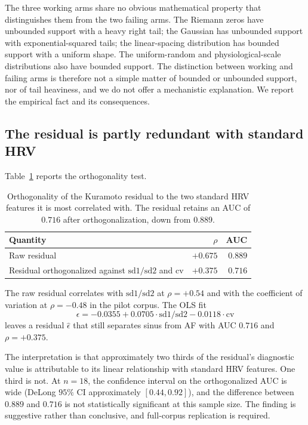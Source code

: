 \documentclass[11pt]{article}
\begin{document}
The three working arms share no obvious mathematical property that
distinguishes them from the two failing arms. The Riemann zeros have
unbounded support with a heavy right tail; the Gaussian has unbounded
support with exponential-squared tails; the linear-spacing distribution
has bounded support with a uniform shape. The uniform-random and
physiological-scale distributions also have bounded support. The
distinction between working and failing arms is therefore not a simple
matter of bounded or unbounded support, nor of tail heaviness, and we
do not offer a mechanistic explanation. We report the empirical fact
and its consequences.

\subsection{The residual is partly redundant with standard HRV}

Table~\ref{tab:orthogonality} reports the orthogonality test.

\begin{table}[h]
\centering
\begin{tabular}{lrr}
\toprule
Quantity & $\rho$ & AUC \\
\midrule
Raw residual & $+0.675$ & $0.889$ \\
Residual orthogonalized against $\mathrm{sd1}/\mathrm{sd2}$ and
$\mathrm{cv}$ & $+0.375$ & $0.716$ \\
\bottomrule
\end{tabular}
\caption{Orthogonality of the Kuramoto residual to the two standard
HRV features it is most correlated with. The residual retains an AUC of
$0.716$ after orthogonalization, down from $0.889$.}
\label{tab:orthogonality}
\end{table}

The raw residual correlates with $\mathrm{sd1}/\mathrm{sd2}$ at
$\rho = +0.54$ and with the coefficient of variation at
$\rho = -0.48$ in the pilot corpus. The OLS fit
\begin{equation}
\epsilon = -0.0355 + 0.0705 \cdot \mathrm{sd1/sd2}
- 0.0118 \cdot \mathrm{cv}
\end{equation}
leaves a residual $\hat{\epsilon}$ that still separates sinus from AF
with AUC $0.716$ and $\rho = +0.375$.

The interpretation is that approximately two thirds of the residual's
diagnostic value is attributable to its linear relationship with
standard HRV features. One third is not. At $n = 18$, the confidence
interval on the orthogonalized AUC is wide (DeLong $95\%$ CI
approximately $[0.44, 0.92]$), and the difference between $0.889$ and
$0.716$ is not statistically significant at this sample size. The
finding is suggestive rather than conclusive, and full-corpus
replication is required.
\end{document}
